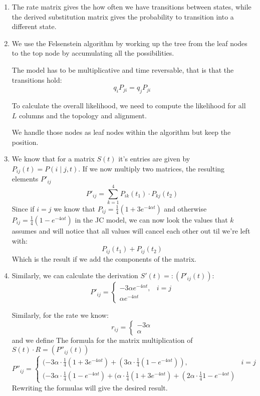 \begin{enumerate}[label=(\alph*)]
\item The rate matrix gives the how often we have transitions between states,
  while the derived substitution matrix gives the probability to transition into
  a different state.
\item We use the Felsenstein algorithm by working up the tree from the leaf
  nodes to the top node by accumulating all the possibilities.

  The model has to be multiplicative and time reversable, that is that the
  transitions hold:
  \[
    q_i P_{ji} = q_j P_{ji}
  \]

  To calculate the overall likelihood, we need to compute the likelihood for all
  \(L\) columns and the topology and alignment.

  We handle those nodes as leaf nodes within the algorithm but keep the
  position.
\item We know that for a matrix \(S(t)\) it's entries are given by
  \(P_{ij}(t)=P(i \mid j, t)\).  If we now multiply two matrices, the resulting
  elements \(P'_{ij}\)
  \[
    P'_{ij} = \sum_{k=1}^4 P_{ik}(t_1) \cdot P_{kj}(t_2)
  \]
  Since if \(i=j\) we know that \(P_{ij}=\frac{1}{4}(1+3e^{-4\alpha t})\) and
  otherwise \(P_{ij}=\frac{1}{4}(1-e^{-4\alpha t})\) in the JC model, we can
  now look the values that \(k\) assumes and will notice that all values will
  cancel each other out til we're left with:
  \[
    P_{ij}(t_1) + P_{ij}(t_2)
  \]
  Which is the result if we add the components of the matrix.
\item Similarly, we can calculate the derivation \(S'(t)=: (P'_{ij}(t))\):
  \[
    P'_{ij} = \begin{cases}
        -3\alpha e^{-4\alpha t}, &i=j \\
          \alpha e^{-4\alpha t}
    \end{cases}
  \]

  Similarly, for the rate we know:
  \[
    r_{ij} = \begin{cases}
        -3\alpha \\
        \alpha
    \end{cases}
  \]
  and we define
  The formula for the matrix multiplication of \(S(t)\cdot R=(P''_{ij}(t))\)
  \[
    P''_{ij} = \begin{cases}
        (-3\alpha\cdot \frac{1}{4}(1+3e^{-4\alpha t}) + (3\alpha\cdot \frac{1}{4}(1- e^{-4\alpha t})), &i=j \\
        (-3\alpha\cdot \frac{1}{4}(1- e^{-4\alpha t}) + ( \alpha\cdot \frac{1}{4}(1+3e^{-4\alpha t}) + (2\alpha\cdot \frac{1}{4}1- e^{-4\alpha t})
    \end{cases}
  \]
  Rewriting the formulas will give the desired result.


\end{enumerate}
